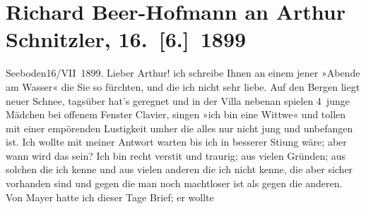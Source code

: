 

               \section[Richard Beer-Hofmann an Arthur Schnitzler, 16. {[}6.{]} 1899]{ Richard Beer-Hofmann an Arthur Schnitzler,
               16. {[}6.{]} 1899}\nopagebreak{}\rehead{ }\begin{ledgroupsized}[t]{13cm}\normalsize\beginnumbering{} \toendnotes[C]{\smallbreak\pagebreak[2]} 
\toendnotes[C]{\smallbreak}\pstart
           \raggedleft{}{\pb}Seeboden16/VII 1899.\pend
           \pstart
           Lieber Arthur! ich schreibe Ihnen an einem jener »Abende am Wasser«
               die Sie so fürchten, und die ich nicht sehr liebe. Auf den Bergen liegt neuer Schnee,
               tagsüber hat’s geregnet und in der Villa nebenan spielen 4 junge Mäd{\pb}chen bei offenem Fenster Clavier,
               singen »ich bin eine Wittwe« und tollen mit einer
               empörenden Lustigkeit umher die alles nur nicht jung und unbefangen ist.\pend
           \pstart
           Ich wollte mit meiner Antwort warten bis ich in besserer Sti{\geminationm}ung wäre; aber wann {\pb}wird das sein? Ich bin recht
                  versti{\geminationm}t und traurig; aus vielen Gründen; aus solchen
                   die ich kenne und aus vielen anderen die ich
               nicht kenne, die aber sicher vorhanden sind und gegen die man noch machtloser {\pb}ist als gegen die anderen. Von Mayer hatte ich dieser Tage Brief; er wollte

\end{ledgroupsized}
